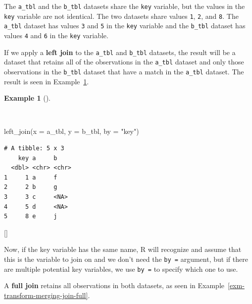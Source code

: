 \documentclass[
  letterpaper,
  krantz1]{latex/krantz-mod}
\newenvironment{Shaded}{\begin{snugshade}}{\end{snugshade}}
\newcommand{\AttributeTok}[1]{\textcolor[rgb]{0.00,0.00,0.00}{#1}}
\newcommand{\FunctionTok}[1]{\textcolor[rgb]{0.00,0.00,0.00}{#1}}
\newcommand{\NormalTok}[1]{\textcolor[rgb]{0.00,0.00,0.00}{#1}}
\newcommand{\StringTok}[1]{\textcolor[rgb]{0.00,0.00,0.00}{#1}}
\newcommand{\cindex}[1]{%
  \StrSubstitute{#1}{_}{\_}[\temp]%
  \index{\temp}%
}
\theoremstyle{definition}
\theoremstyle{definition}
\newtheorem{example}{Example}[chapter]
\theoremstyle{remark}
\begin{document}
The \texttt{a\_tbl} and the \texttt{b\_tbl} datasets share the
\texttt{key} variable, but the values in the \texttt{key} variable are
not identical. The two datasets share values \texttt{1}, \texttt{2}, and
\texttt{8}. The \texttt{a\_tbl} dataset has values \texttt{3} and
\texttt{5} in the \texttt{key} variable and the \texttt{b\_tbl} dataset
has values \texttt{4} and \texttt{6} in the \texttt{key} variable.

If we apply a \textbf{left join} to
the \texttt{a\_tbl} and \texttt{b\_tbl} datasets, the result will be a
dataset that retains all of the observations in the \texttt{a\_tbl}
dataset and only those observations in the \texttt{b\_tbl} dataset that
have a match in the \texttt{a\_tbl} dataset. The result is seen in
Example~\ref{exm-transform-merging-join-left}.

\begin{example}[]\protect\hypertarget{exm-transform-merging-join-left}{}\label{exm-transform-merging-join-left}

~

\begin{Shaded}
\begin{Highlighting}[numbers=left,,]
\FunctionTok{left\_join}\NormalTok{(}\AttributeTok{x =}\NormalTok{ a\_tbl, }\AttributeTok{y =}\NormalTok{ b\_tbl, }\AttributeTok{by =} \StringTok{"key"}\NormalTok{)}
\end{Highlighting}
\end{Shaded}

\begin{verbatim}
# A tibble: 5 x 3
    key a     b    
  <dbl> <chr> <chr>
1     1 a     f    
2     2 b     g    
3     3 c     <NA> 
4     5 d     <NA> 
5     8 e     j    
\end{verbatim}

 \cindex{left_join()}

\end{example}

Now, if the key variable has the same name, R will recognize and assume
that this is the variable to join on and we don't need the
\texttt{by\ =} argument, but if there are multiple potential key
variables, we use \texttt{by\ =} to specify which one to use.

A \textbf{full join} retains all
observations in both datasets, as seen in
Example~\ref{exm-transform-merging-join-full}.
\end{document}
